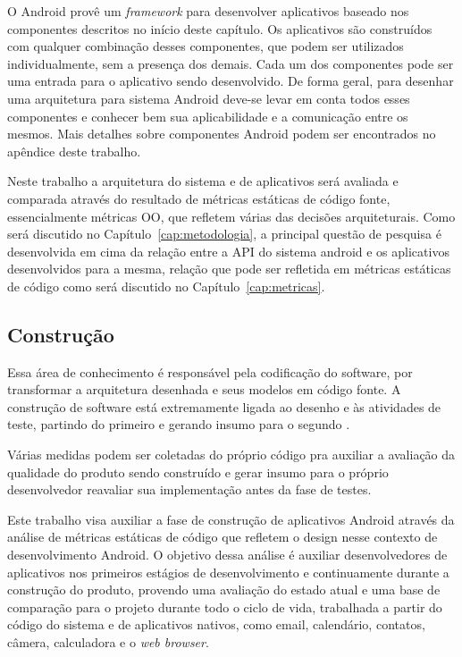 O Android provê um \textit{framework} para desenvolver aplicativos baseado nos componentes descritos no início deste capítulo. Os aplicativos são construídos com qualquer combinação desses componentes, que podem ser utilizados individualmente, sem a presença dos demais. Cada um dos componentes pode ser uma entrada para o aplicativo sendo desenvolvido. De forma geral, para desenhar uma arquitetura para sistema Android deve-se levar em conta todos esses componentes e conhecer bem sua aplicabilidade e a comunicação entre os mesmos. Mais detalhes sobre componentes Android podem ser encontrados no apêndice deste trabalho.

Neste trabalho a arquitetura do sistema e de aplicativos será avaliada e comparada através do resultado de métricas estáticas de código fonte, essencialmente métricas OO, que refletem várias das decisões arquiteturais. Como será discutido no Capítulo~\ref{cap:metodologia}, a principal questão de pesquisa é desenvolvida em cima da relação entre a API do sistema android e os aplicativos desenvolvidos para a mesma, relação que pode ser refletida em métricas estáticas de código como será discutido no Capítulo~\ref{cap:metricas}.

\subsection{Construção}

Essa área de conhecimento é responsável pela codificação do software, por transformar a arquitetura desenhada e seus modelos em código fonte. A construção de software está extremamente ligada ao desenho e às atividades de teste, partindo do primeiro e gerando insumo para o segundo \cite{swebok}.

Várias medidas podem ser coletadas do próprio código pra auxiliar a avaliação da qualidade do produto sendo construído e gerar insumo para o próprio desenvolvedor reavaliar sua implementação antes da fase de testes. 

Este trabalho visa auxiliar a fase de construção de aplicativos Android através da análise de métricas estáticas de código que refletem o design nesse contexto de desenvolvimento Android. O objetivo dessa análise é auxiliar desenvolvedores de aplicativos nos primeiros estágios de desenvolvimento e continuamente durante a construção do produto, provendo uma avaliação do estado atual e uma base de comparação para o projeto durante todo o ciclo de vida, trabalhada a partir do código do sistema e de aplicativos nativos, como email, calendário, contatos, câmera, calculadora e o \textit{web browser}.

